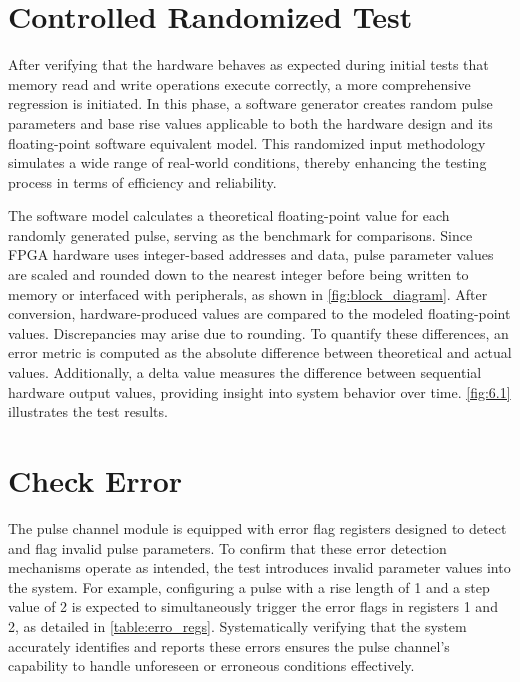 \section{Controlled Randomized Test}

After verifying that the hardware behaves as expected during initial tests that memory read and write operations execute correctly, a more comprehensive regression is initiated. In this phase, a software generator creates random pulse parameters and base rise values applicable to both the hardware design and its floating-point software equivalent model. This randomized input methodology simulates a wide range of real-world conditions, thereby enhancing the testing process in terms of efficiency and reliability.

The software model calculates a theoretical floating-point value for each randomly generated pulse, serving as the benchmark for comparisons. Since FPGA hardware uses integer-based addresses and data, pulse parameter values are scaled and rounded down to the nearest integer before being written to memory or interfaced with peripherals, as shown in \autoref{fig:block_diagram}. After conversion, hardware-produced values are compared to the modeled floating-point values. Discrepancies may arise due to rounding. To quantify these differences, an error metric is computed as the absolute difference between theoretical and actual values. Additionally, a delta value measures the difference between sequential hardware output values, providing insight into system behavior over time. \autoref{fig:6.1} illustrates the test results.

\section{Check Error}

The pulse channel module is equipped with error flag registers designed to detect and flag invalid pulse parameters. To confirm that these error detection mechanisms operate as intended, the test introduces invalid parameter values into the system. For example, configuring a pulse with a rise length of 1 and a step value of 2 is expected to simultaneously trigger the error flags in registers 1 and 2, as detailed in \autoref{table:erro_regs}. Systematically verifying that the system accurately identifies and reports these errors ensures the pulse channel's capability to handle unforeseen or erroneous conditions effectively. 
